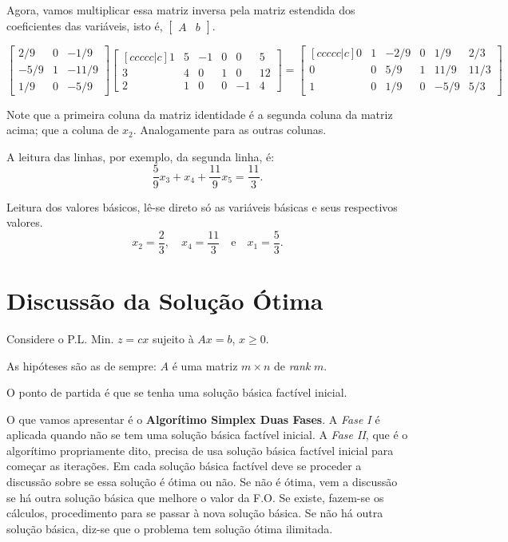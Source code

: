 Agora, vamos multiplicar essa matriz inversa pela matriz estendida dos 
coeficientes das variáveis, isto é, $ \begin{bmatrix} A & b \end{bmatrix} $.

{\scriptsize
\[
  \begin{bmatrix}
    2/9 & 0 &  -1/9 \\
   -5/9 & 1 & -11/9 \\
    1/9 & 0 &  -5/9
  \end{bmatrix}
  \begin{bmatrix}[ccccc|c]
   1 & 5 & -1 & 0 &  0 &  5 \\
   3 & 4 &  0 & 1 &  0 & 12 \\
   2 & 1 &  0 & 0 & -1 &  4 
  \end{bmatrix}
  =
  \begin{bmatrix}[ccccc|c]
   0 & 1 & -2/9 & 0 &  1/9 &  2/3 \\
   0 & 0 &  5/9 & 1 & 11/9 & 11/3 \\
   1 & 0 &  1/9 & 0 & -5/9 &  5/3
  \end{bmatrix}
\]
}

Note que a primeira coluna da matriz identidade é a segunda coluna da matriz
acima; que a coluna de $ x_2 $.
Analogamente para as outras colunas.

A leitura das linhas, por exemplo, da segunda linha, é:
\[
  \frac{5}{9}x_3 + x_4 + \frac{11}{9}x_5 = \frac{11}{3}.
\]

Leitura dos valores básicos, lê-se direto só as variáveis básicas e seus 
respectivos valores.
\[
  x_2 = \frac{2}{3}, \quad x_4 = \frac{11}{3} \quad \text{e} \quad x_1 = \frac{5}{3}.
\]





\section{Discussão da Solução Ótima} %

Considere o P.L. $ \text{Min. } z = cx $ sujeito à $ Ax = b $, $ x \geq 0 $.

As hipóteses são as de sempre: $ A $ é uma matriz $ m \times n $ de \textit{rank}
$ m $.

O ponto de partida é que se tenha uma solução básica factível inicial.

O que vamos apresentar é o \textbf{Algorítimo Simplex Duas Fases}.
A \textit{Fase I} é aplicada quando não se tem uma solução básica factível 
inicial.
A \textit{Fase II}, que é o algorítimo propriamente dito, precisa de usa solução
básica factível inicial para começar as iterações.
Em cada solução básica factível deve se proceder a discussão sobre se essa 
solução é ótima ou não.
Se não é ótima, vem a discussão se há outra solução básica que melhore o valor
da F.O.
Se existe, fazem-se os cálculos, procedimento para se passar à nova solução 
básica.
Se não há outra solução básica, diz-se que o problema tem solução ótima 
ilimitada.

